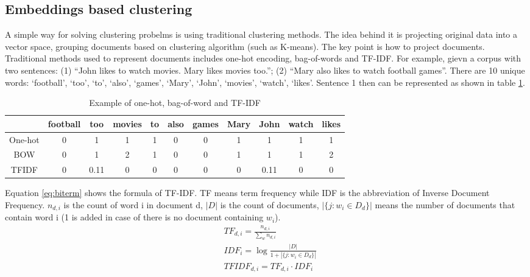 \subsection{Embeddings based clustering}
\label{sec:Document vector}
A simple way for solving clustering probelms is using traditional clustering methods. The idea behind it is projecting original data into a vector space, grouping documents based on clustering algorithm (such as K-means). The key point is how to project documents. Traditional methods used to represent documents includes one-hot encoding, bag-of-words and TF-IDF. For example, gievn a corpus with two sentences: (1) ``John likes to watch movies. Mary likes movies too.''; (2) ``Mary also likes to watch football games''. There are 10 unique words: `football', `too', `to', `also', `games', `Mary', `John', `movies', `watch', `likes'. Sentence 1 then can be represented as shown in table \ref{tab:bow1}.
\begin{table}[!htbp]
    \centering
    \hspace{0.5cm}
    \begin{tabular}{|c|c|c|c|c|c|c|c|c|c|c|}
        \hline
         & football & too & movies & to & also & games & Mary & John & watch & likes \\ \hline
         One-hot & 0 & 1 & 1 & 1 & 0 & 0 & 1 & 1 & 1 & 1 \\\hline
         BOW & 0 & 1 & 2 & 1 & 0 & 0 & 1 & 1 & 1 & 2 \\\hline
         TFIDF & 0 & 0.11 & 0 & 0 & 0 & 0 & 0 & 0.11 & 0 & 0 \\\hline
    \end{tabular}
    \caption{Example of one-hot, bag-of-word and TF-IDF}
    \label{tab:bow1}
\end{table}
Equation \ref{eq:biterm} shows the formula of TF-IDF. TF means term frequency while IDF is the abbreviation of Inverse Document Frequency. $n_{d,i}$ is the count of word i in document d, $|D|$ is the count of documents, $|\{j: w_i \in D_d\}|$ means the number of documents that contain word i (1 is added in case of there is no document containing $w_i$).
\begin{equation}
    \begin{aligned}
        &TF_{d,i} = \frac{n_{d,i}}{\sum_wn_{d,i}}\\
        &IDF_{i} = \log\frac{|D|}{1 + |\{j: w_i \in D_d\}|} \\
        &TFIDF_{d,i} = TF_{d,i} \cdot IDF_{i}
    \end{aligned} 
    \label{eq:tfidf}
\end{equation}
